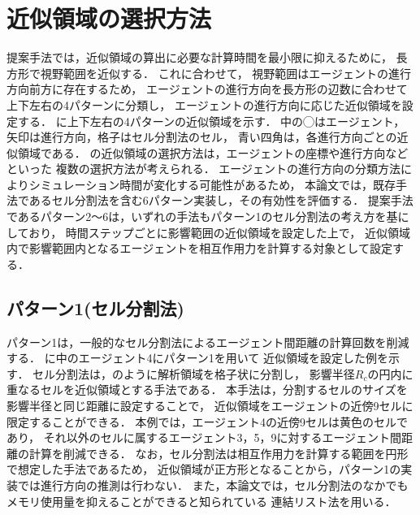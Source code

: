 \section{近似領域の選択方法}
提案手法では，近似領域の算出に必要な計算時間を最小限に抑えるために，
長方形で視野範囲を近似する．
これに合わせて，
視野範囲はエージェントの進行方向前方に存在するため，
エージェントの進行方向を長方形の辺数に合わせて上下左右の4パターンに分類し，
エージェントの進行方向に応じた近似領域を設定する．
に上下左右の4パターンの近似領域を示す．
中の◯はエージェント，矢印は進行方向，格子はセル分割法のセル，
青い四角は，各進行方向ごとの近似領域である．
の近似領域の選択方法は，エージェントの座標や進行方向などといった
複数の選択方法が考えられる．
エージェントの進行方向の分類方法によりシミュレーション時間が変化する可能性があるため，
本論文では，既存手法であるセル分割法を含む6パターン実装し，その有効性を評価する．
提案手法であるパターン2～6は，いずれの手法もパターン1のセル分割法の考え方を基にしており，
時間ステップごとに影響範囲の近似領域を設定した上で，
近似領域内で影響範囲内となるエージェントを相互作用力を計算する対象として設定する．



\subsection{パターン1(セル分割法)}
パターン1は，一般的なセル分割法\cite{cell1}\cite{cell2}によるエージェント間距離の計算回数を削減する．
に中のエージェント4にパターン1を用いて
近似領域を設定した例を示す．
セル分割法は，のように解析領域を格子状に分割し，
影響半径$R_{c}$の円内に重なるセルを近似領域とする手法である．
本手法は，分割するセルのサイズを影響半径と同じ距離に設定することで，
近似領域をエージェントの近傍9セルに限定することができる．
本例では，エージェント4の近傍9セルは黄色のセルであり，
それ以外のセルに属するエージェント3，5，9に対するエージェント間距離の計算を削減できる．
なお，セル分割法は相互作用力を計算する範囲を円形で想定した手法であるため，
近似領域が正方形となることから，パターン1の実装では進行方向の推測は行わない．
また，本論文では，セル分割法のなかでもメモリ使用量を抑えることができると知られている
連結リスト法\cite{cell_book1}\cite{cell_renketu}を用いる．

